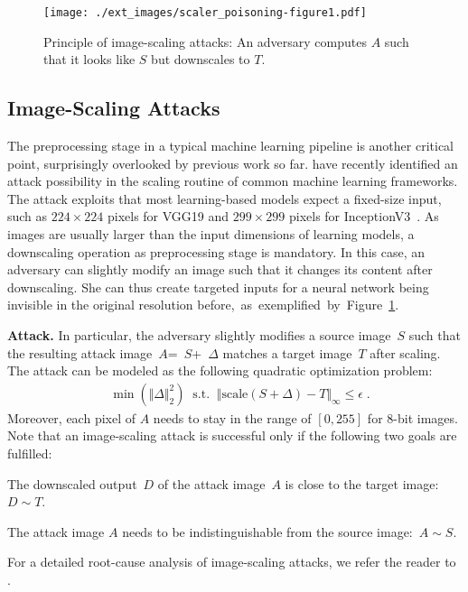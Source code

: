 \documentclass[conference]{IEEEtran}
\renewcommand{\paragraph}[1]{{\vskip 8pt \noindent\bf #1 }}
\newcommand{\srcimg}{\ensuremath{S}\xspace}
\newcommand{\tarimg}{\ensuremath{T}\xspace}
\newcommand{\attimg}{\ensuremath{A}\xspace}
\newcommand{\outimg}{\ensuremath{D}\xspace}
\newcommand{\deltaS}{\ensuremath{\Delta}\xspace}
\newcommand{\scalefunc}{\ensuremath{\mathrm{scale}}}
\newcommand{\goalA}{O1\xspace} \newcommand{\goalB}{O2\xspace}
\begin{document}
\begin{figure}[t]
	\centering
	\texttt{[image: ./ext\_images/scaler\_poisoning-figure1.pdf]}
	\vspace{-0.5em}
	\caption{Principle of image-scaling attacks: An
		adversary computes \attimg such that it looks like \srcimg but
		downscales to \tarimg.}
	\label{fig:attack_example}
\end{figure}

\subsection{Image-Scaling Attacks}
\label{subsec:scalingattacksbackground}
The preprocessing stage in a typical machine learning pipeline
is another critical point, surprisingly overlooked by previous 
work so far. \citet{XiaCheShe+19} have recently identified an attack 
possibility in the scaling routine of common machine learning 
frameworks. The attack exploits that most learning-based models expect 
a fixed-size input, such as $224 \times 224$ pixels for 
VGG19 and $299 \times 299$ pixels for 
InceptionV3~\citep{SimZis14,SzeVanIof+15}.
As images are usually larger than the input dimensions of learning 
models, a downscaling operation as preprocessing stage is mandatory. 
In this case, an adversary can slightly modify an image such that it 
changes its content after downscaling. She can thus create targeted 
inputs for a neural network being invisible in the original 
resolution before,~as~exemplified~by~Figure~\ref{fig:attack_example}.

\paragraph{Attack.}
In particular, the adversary slightly modifies a source image~\srcimg 
such that the resulting attack image~\mbox{\attimg = \srcimg + \deltaS} 
matches a target image~\tarimg after scaling. The attack can be modeled 
as the following quadratic optimization problem:
\begin{align}
&\min ( \Vert \deltaS \Vert_2^2 ) \; \;
\mathrm{s.t.} \; \; \Vert \scalefunc(\srcimg + \deltaS) - \tarimg
\Vert_{\infty} \leqslant \epsilon  \; .
\label{eq:opti_problem_basic}
\end{align}
Moreover, each pixel of \attimg needs to stay in the range of 
$[0,255]$ for 8-bit images. 
Note that an image-scaling attack is successful only if the 
following two goals are fulfilled:
\begin{description}[leftmargin=!,labelwidth=\widthof{\textit{(O2)}}]
	\item[\textit{(\goalA)}] The downscaled output~\outimg of the 
	attack image~\attimg is close to 
	the target image:  $\outimg \sim \tarimg $.
	\item[\textit{(\goalB)}]
	The attack image \attimg needs to be indistinguishable from the 
	source image:~\mbox{$\attimg \sim \srcimg$}.
\end{description}
For a detailed root-cause analysis of image-scaling attacks, we refer 
the reader to \citet{QuiKleArp20}.
\end{document}
